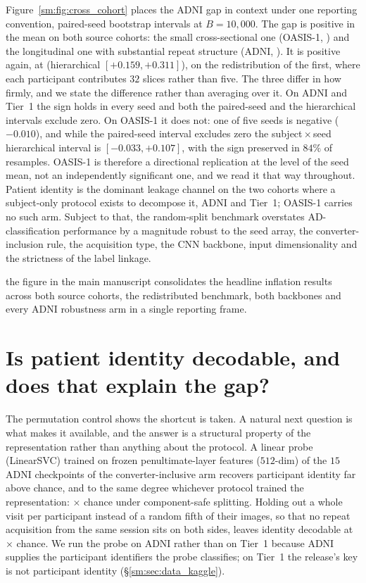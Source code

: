 \documentclass[11pt]{article}
\begin{document}
Figure~\ref{sm:fig:cross_cohort} places the ADNI gap in context under
one reporting convention, paired-seed bootstrap intervals at
$B=10{,}000$. The gap is positive in the mean on both source cohorts:
the small cross-sectional one (OASIS-1, \OasisGapTotal{}
\OasisGapCI{}) and the longitudinal one with substantial repeat
structure (ADNI, \AdniGapTotal{} \AdniGapCI{}). It is positive again,
at \TierOneGapTotal{} \TierOneGapCI{} (hierarchical
$[+0.159, +0.311]$), on the redistribution of the first, where each
participant contributes $32$ slices rather than five. The three differ in how firmly, and we state the difference
rather than averaging over it. On ADNI and Tier~1 the sign holds in
every seed and both the paired-seed and the hierarchical intervals
exclude zero. On OASIS-1 it does not: one of five seeds is negative
($-0.010$), and while the paired-seed interval excludes zero the
subject\,$\times$\,seed hierarchical interval is
$[-0.033, +0.107]$, with the sign preserved in $84\%$ of resamples.
OASIS-1 is therefore a directional replication at the level of the
seed mean, not an independently significant one, and we read it that
way throughout. Patient identity is the dominant leakage channel on
the two cohorts where a subject-only protocol exists to decompose it,
ADNI and Tier~1; OASIS-1 carries no such arm. Subject to that, the
random-split benchmark overstates AD-classification performance by a
magnitude robust to the seed array, the converter-inclusion rule, the
acquisition type, the CNN backbone, input dimensionality and the
strictness of the label linkage.

the figure in the main manuscript consolidates the headline inflation
results across both source cohorts, the redistributed benchmark, both
backbones and every ADNI robustness arm in a single reporting frame.






\section{Is patient identity decodable, and does that explain the gap?}
\label{sm:sec:exp2_probe}

The permutation control shows the shortcut is taken. A natural next
question is what makes it available, and the answer is a structural
property of the representation rather than anything about the protocol.
A linear probe (LinearSVC) trained on frozen penultimate-layer
features ($512$-dim) of the $15$ ADNI checkpoints of the
converter-inclusive arm recovers participant identity far above
chance, and to the same degree whichever protocol trained the
representation: \ProbeLiftImage$\times$ chance under component-safe
splitting. Holding out a whole visit per participant instead of a
random fifth of their images, so that no repeat acquisition from the
same session sits on both sides, leaves identity decodable at
\ProbeLiftSession$\times$ chance. We run the probe on ADNI rather than
on Tier~1 because ADNI supplies the participant identifiers the probe
classifies; on Tier~1 the release's key is not participant identity
(\S\ref{sm:sec:data_kaggle}).
\end{document}
